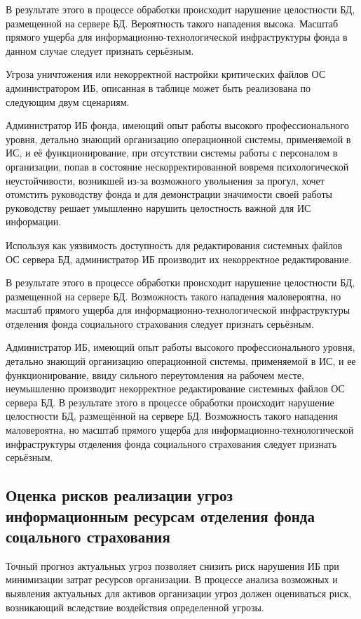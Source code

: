 В результате этого в процессе обработки происходит нарушение
целостности БД, размещенной на сервере БД. Вероятность такого
нападения высока. Масштаб прямого ущерба для
информационно-технологической инфраструктуры фонда в данном случае
следует признать серьёзным.

\point Угроза уничтожения или некорректной настройки критических
файлов ОС администратором ИБ, описанная в таблице может быть
реализована по следующим двум сценариям.

\point Администратор ИБ фонда, имеющий опыт работы высокого
профессионального уровня, детально знающий организацию операционной
системы, применяемой в ИС, и её функционирование, при отсутствии
системы работы с персоналом в организации, попав в состояние
нескорректированной вовремя психологической неустойчивости, возникшей
из-за возможного увольнения за прогул, хочет отомстить руководству
фонда и для демонстрации значимости своей работы руководству решает
умышленно нарушить целостность важной для ИС информации.

Используя как уязвимость доступность для редактирования системных
файлов ОС сервера БД, администратор ИБ производит их некорректное
редактирование.

В результате этого в процессе обработки происходит нарушение
целостности БД, размещенной на сервере БД.  Возможность такого
нападения маловероятна, но масштаб прямого ущерба для
информационно-технологической инфраструктуры отделения фонда
социального страхования следует признать серьёзным.

\point Администратор ИБ, имеющий опыт работы высокого
профессионального уровня, детально знающий организацию операционной
системы, применяемой в ИС, и ее функционирование, ввиду сильного
переутомления на рабочем месте, неумышленно производит некорректное
редактирование системных файлов ОС сервера БД.  В результате этого в
процессе обработки происходит нарушение целостности БД, размещённой на
сервере БД.  Возможность такого нападения маловероятна, но масштаб
прямого ущерба для информационно-технологической инфраструктуры
отделения фонда социального страхования следует признать серьёзным.

\subsection{Оценка рисков реализации угроз информационным ресурсам
  отделения фонда соцального страхования}

\point Точный прогноз актуальных угроз позволяет снизить риск
нарушения ИБ при минимизации затрат ресурсов организации. В процессе
анализа возможных и выявления актуальных для активов организации угроз
должен оцениваться риск, возникающий вследствие воздействия
определенной угрозы.

